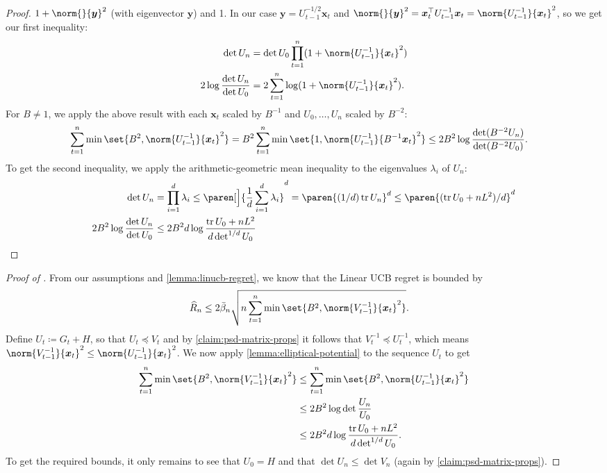 \documentclass{article}
\renewcommand{\vec}[1]{\bm{#1}}
\newcommand{\defeq}{\coloneq}
\newcommand{\inv}[1]{#1^{-1}}
\DeclareMathOperator{\tr}{tr}
\DeclarePairedDelimiter{\paren}()
\providecommand\transp{\top}
\let\transpsymbol\transp
\renewcommand{\transp}[1]{#1^\transpsymbol}
\begin{document}
\begin{proof}
  $1+\norm{}{\vec y}^2$ (with eigenvector $\vec y$) and 1.  In our
  case $\vec y = U_{t-1}^{-1/2} \vec x_t$ and
  $\norm{}{\vec y}^2 = \transp{\vec x_t} \inv{U_{t-1}} \vec x_t =
  \norm{\inv{U_{t-1}}}{\vec x_t}^2$, so we get our first inequality:
  \begin{align*}
    \det U_n &= \det U_0 \prod_{t=1}^n(1 + \norm{\inv{U_{t-1}}}{\vec x_t}^2) \\
    2\log\frac{\det U_n}{\det U_0}
            &= 2\sum_{t=1}^n\log(1+\norm{\inv{U_{t-1}}}{\vec x_t}^2).
  \end{align*}
  For $B \neq 1$, we apply the above result with each $\vec x_t$ scaled by
  $B^{-1}$ and $U_0,\dotsc,U_n$ scaled by $B^{-2}$:
  \begin{align*}
    \sum_{t=1}^n\min\set{B^2,\norm{\inv{U_{t-1}}}{\vec x_t}^2}
    &= B^2 \sum_{t=1}^n\min\set{1,\norm{\inv{U_{t-1}}}{B^{-1} \vec x_t}^2}
      \le 2B^2 \log\frac{\det(B^{-2}U_n)}{\det(B^{-2}U_0)}.
  \end{align*}
  To get the second inequality, we apply the arithmetic-geometric
  mean inequality to the eigenvalues $\lambda_i$ of $U_n$:
  \begin{align*}
    \det U_n &= \prod_{i=1}^d \lambda_i
              \le \paren[\Big]{\frac{1}{d} \sum_{i=1}^d \lambda_i}^d
              = \paren{(1/d)\tr U_n}^d
              \le \paren{(\tr U_0 + nL^2)/d}^d \\
    2B^2 \log\frac{\det U_n}{\det U_0}
            &\le 2B^2d \log\frac{\tr U_0 + nL^2}{d\det^{1/d}U_0}
              \qedhere
  \end{align*}
\end{proof}

\begin{proof}[Proof of ]
  From our assumptions and \cref{lemma:linucb-regret}, we know that
  the Linear UCB regret is bounded by
  \begin{align*}
    \widehat{R}_n &\le 2\bar\beta_n\sqrt{n\sum_{t=1}^n\min\set{B^2,
                   \norm{\inv{V_{t-1}}}{\vec x_t}^2}}.
  \end{align*}
  Define $U_t \defeq G_t + H$, so that $U_t \preceq V_t$ and by
  \cref{claim:psd-matrix-props} it follows that
  $\inv{V_t} \preceq \inv{U_t}$, which means
  $\norm{\inv{V_{t-1}}}{\vec x_t}^2 \le \norm{\inv{U_{t-1}}}{\vec x_t}^2$.  We
  now apply \cref{lemma:elliptical-potential} to the sequence $U_t$ to
  get
  \begin{align*}
    \sum_{t=1}^n\min\set{B^2,\norm{\inv{V_{t-1}}}{\vec x_t}^2}
    &\le \sum_{t=1}^n\min\set{B^2,\norm{\inv{U_{t-1}}}{\vec x_t}^2} \\
    &\le 2B^2 \log\det\frac{U_n}{U_0} \\
    &\le 2B^2d \log\frac{\tr U_0 + nL^2}{d \det^{1/d} U_0}.
  \end{align*}
  To get the required bounds, it only remains to see that $U_0 = H$ and
  that $\det U_n \le \det V_n$ (again by
  \cref{claim:psd-matrix-props}).
\end{proof}
\end{document}
